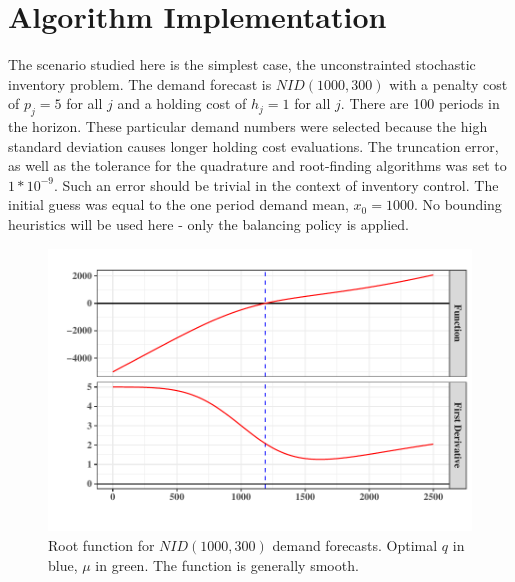 \documentclass[12pt]{article}
\begin{document}
\section{Algorithm Implementation}

The scenario studied here is the simplest case, the unconstrainted stochastic inventory problem. The demand forecast is $NID(1000, 300)$ with a penalty cost of $p_j = 5$ for all $j$ and a holding cost of $h_j = 1$ for all $j$. There are 100 periods in the horizon. These particular demand numbers were selected because the high standard deviation causes longer holding cost evaluations. The truncation error, as well as the tolerance for the quadrature and root-finding algorithms was set to $1*10^{-9}$. Such an error should be trivial in the context of inventory control. The initial guess was equal to the one period demand mean, $x_0 = 1000$. No bounding heuristics will be used here - only the balancing policy is applied. 
\begin{figure}
\includegraphics[width=\textwidth]{root_function_report}
\caption{Root function for $NID(1000, 300)$ demand forecasts. Optimal $q$ in blue, $\mu$ in green. The function is generally smooth.}
\end{figure}
\end{document}
